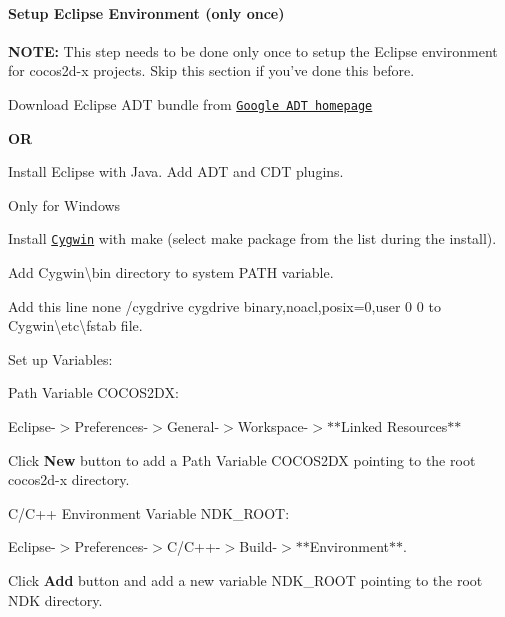 \paragraph*{Setup Eclipse Environment (only once)}

{\bfseries N\-O\-T\-E\-:} This step needs to be done only once to setup the Eclipse environment for cocos2d-\/x projects. Skip this section if you've done this before.


\begin{DoxyEnumerate}
\item Download Eclipse A\-D\-T bundle from \href{http://developer.android.com/sdk/index.html}{\tt Google A\-D\-T homepage}

{\bfseries O\-R}

Install Eclipse with Java. Add A\-D\-T and C\-D\-T plugins.
\item Only for Windows
\begin{DoxyEnumerate}
\item Install \href{http://www.cygwin.com/}{\tt Cygwin} with make (select make package from the list during the install).
\item Add {\ttfamily Cygwin\textbackslash{}bin} directory to system P\-A\-T\-H variable.
\item Add this line {\ttfamily none /cygdrive cygdrive binary,noacl,posix=0,user 0 0} to {\ttfamily Cygwin\textbackslash{}etc\textbackslash{}fstab} file.
\end{DoxyEnumerate}
\item Set up Variables\-:
\begin{DoxyEnumerate}
\item Path Variable {\ttfamily C\-O\-C\-O\-S2\-D\-X}\-:
\begin{DoxyItemize}
\item Eclipse-\/$>$Preferences-\/$>$General-\/$>$Workspace-\/$>$$\ast$$\ast$\-Linked Resources$\ast$$\ast$
\item Click {\bfseries New} button to add a Path Variable {\ttfamily C\-O\-C\-O\-S2\-D\-X} pointing to the root cocos2d-\/x directory. 
\end{DoxyItemize}
\item C/\-C++ Environment Variable {\ttfamily N\-D\-K\-\_\-\-R\-O\-O\-T}\-:
\begin{DoxyItemize}
\item Eclipse-\/$>$Preferences-\/$>$C/\-C++-\/$>$Build-\/$>$$\ast$$\ast$\-Environment$\ast$$\ast$.
\item Click {\bfseries Add} button and add a new variable {\ttfamily N\-D\-K\-\_\-\-R\-O\-O\-T} pointing to the root N\-D\-K directory. 
$$
\end{DoxyItemize}
\end{DoxyEnumerate}
\end{DoxyEnumerate}
